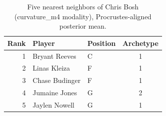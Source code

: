 \begin{table}[htbp]
  \centering\small
  \begin{tabular}{rllc}
    \toprule
    Rank & Player & Position & Archetype \\
    \midrule
    1 & Bryant Reeves & C & 1 \\
    2 & Linas Kleiza & F & 1 \\
    3 & Chase Budinger & F & 1 \\
    4 & Jumaine Jones & G & 2 \\
    5 & Jaylen Nowell & G & 1 \\
    \bottomrule
  \end{tabular}
  \caption{Five nearest neighbors of Chris Bosh (curvature_m4 modality), Procrustes-aligned posterior mean.}
  \label{tab:Chris_Bosh_neighbors_curvature_m4}
\end{table}

